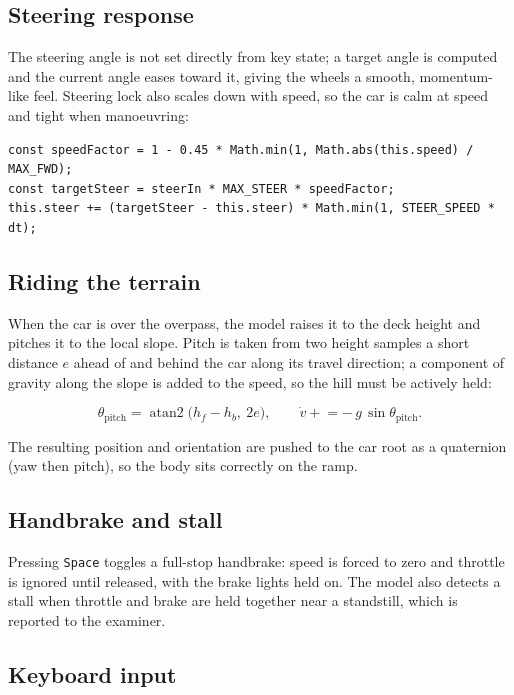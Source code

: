 \documentclass[11pt]{article}
\newcommand{\code}[1]{\texttt{#1}}
\begin{document}
\subsection{Steering response}

The steering angle is not set directly from key state; a target angle is computed
and the current angle eases toward it, giving the wheels a smooth,
momentum-like feel. Steering lock also scales down with speed, so the car is
calm at speed and tight when manoeuvring:

\begin{lstlisting}[caption={Eased, speed-sensitive steering (\code{vehicle.js}).}]
const speedFactor = 1 - 0.45 * Math.min(1, Math.abs(this.speed) / MAX_FWD);
const targetSteer = steerIn * MAX_STEER * speedFactor;
this.steer += (targetSteer - this.steer) * Math.min(1, STEER_SPEED * dt);
\end{lstlisting}

\subsection{Riding the terrain}

When the car is over the overpass, the model raises it to the deck height and
pitches it to the local slope. Pitch is taken from two height samples a short
distance $e$ ahead of and behind the car along its travel direction; a component
of gravity along the slope is added to the speed, so the hill must be actively
held:

\[
  \theta_{\mathrm{pitch}} = \operatorname{atan2}\!\big(h_f - h_b,\ 2e\big),
  \qquad
  \dot v \mathrel{+}= -\,g\,\sin\theta_{\mathrm{pitch}} .
\]

The resulting position and orientation are pushed to the car root as a quaternion
(yaw then pitch), so the body sits correctly on the ramp.

\subsection{Handbrake and stall}

Pressing \texttt{Space} toggles a full-stop handbrake: speed is forced to zero
and throttle is ignored until released, with the brake lights held on. The model
also detects a stall when throttle and brake are held together near a standstill,
which is reported to the examiner.

\subsection{Keyboard input}
\end{document}
